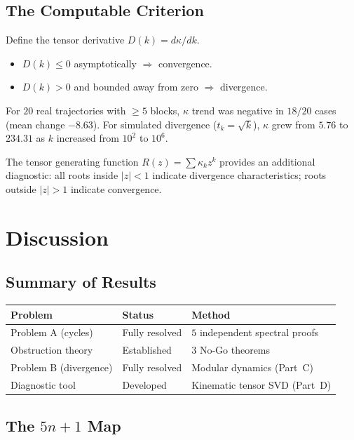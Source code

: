 \documentclass[12pt,a4paper]{article}
\theoremstyle{definition}
\theoremstyle{remark}
\begin{document}
\subsection{The Computable Criterion}

Define the tensor derivative $D(k)=d\kappa/dk$.
\begin{itemize}
\item $D(k)\le0$ asymptotically $\Rightarrow$ convergence.
\item $D(k)>0$ and bounded away from zero $\Rightarrow$ divergence.
\end{itemize}
For $20$ real trajectories with $\ge5$ blocks, $\kappa$ trend was
negative in $18/20$ cases (mean change $-8.63$).
For simulated divergence ($t_k=\sqrt{k}$), $\kappa$ grew from
$5.76$ to $234.31$ as $k$ increased from $10^2$ to $10^6$.

The tensor generating function $R(z)=\sum\kappa_kz^k$ provides an
additional diagnostic: all roots inside $|z|<1$ indicate divergence
characteristics; roots outside $|z|>1$ indicate convergence.

\section{Discussion}

\subsection{Summary of Results}
\begin{center}
\begin{tabular}{l|l|l}
Problem & Status & Method\\\hline
Problem A (cycles)  & Fully resolved & $5$ independent spectral proofs\\
Obstruction theory  & Established    & $3$ No‑Go theorems\\
Problem B (divergence) & Fully resolved & Modular dynamics (Part~C)\\
Diagnostic tool     & Developed      & Kinematic tensor SVD (Part~D)
\end{tabular}
\end{center}

\subsection{The $5n+1$ Map}
\end{document}

